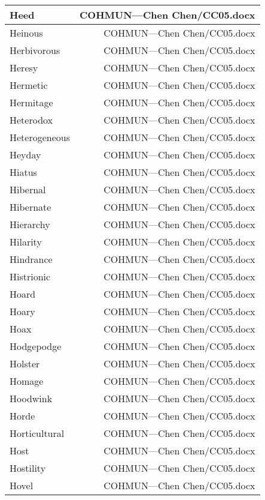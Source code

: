 \documentclass{article}
\begin{document}
\begin{center}
\begin{longtable}{|l|r|}
\hline
Heed  &  COHMUN---Chen Chen/CC05.docx\\  
\hline
Heinous  &  COHMUN---Chen Chen/CC05.docx\\  
\hline
Herbivorous  &  COHMUN---Chen Chen/CC05.docx\\  
\hline
Heresy  &  COHMUN---Chen Chen/CC05.docx\\  
\hline
Hermetic  &  COHMUN---Chen Chen/CC05.docx\\  
\hline
Hermitage  &  COHMUN---Chen Chen/CC05.docx\\  
\hline
Heterodox  &  COHMUN---Chen Chen/CC05.docx\\  
\hline
Heterogeneous  &  COHMUN---Chen Chen/CC05.docx\\  
\hline
Heyday  &  COHMUN---Chen Chen/CC05.docx\\  
\hline
Hiatus  &  COHMUN---Chen Chen/CC05.docx\\  
\hline
Hibernal  &  COHMUN---Chen Chen/CC05.docx\\  
\hline
Hibernate  &  COHMUN---Chen Chen/CC05.docx\\  
\hline
Hierarchy  &  COHMUN---Chen Chen/CC05.docx\\  
\hline
Hilarity  &  COHMUN---Chen Chen/CC05.docx\\  
\hline
Hindrance  &  COHMUN---Chen Chen/CC05.docx\\  
\hline
Histrionic  &  COHMUN---Chen Chen/CC05.docx\\  
\hline
Hoard  &  COHMUN---Chen Chen/CC05.docx\\  
\hline
Hoary  &  COHMUN---Chen Chen/CC05.docx\\  
\hline
Hoax  &  COHMUN---Chen Chen/CC05.docx\\  
\hline
Hodgepodge  &  COHMUN---Chen Chen/CC05.docx\\  
\hline
Holster  &  COHMUN---Chen Chen/CC05.docx\\  
\hline
Homage  &  COHMUN---Chen Chen/CC05.docx\\  
\hline
Hoodwink  &  COHMUN---Chen Chen/CC05.docx\\  
\hline
Horde  &  COHMUN---Chen Chen/CC05.docx\\  
\hline
Horticultural  &  COHMUN---Chen Chen/CC05.docx\\  
\hline
Host  &  COHMUN---Chen Chen/CC05.docx\\  
\hline
Hostility  &  COHMUN---Chen Chen/CC05.docx\\  
\hline
Hovel  &  COHMUN---Chen Chen/CC05.docx\\  
\hline

\end{longtable}
\end{center}
\end{document}
